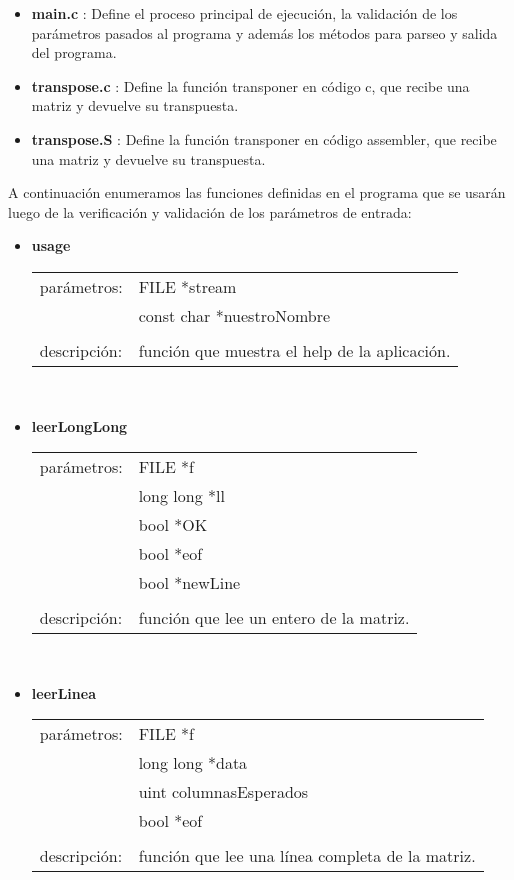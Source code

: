 \documentclass[a4paper]{article}
\begin{document}
\begin{itemize}
	\item \textbf{main.c} : Define el proceso principal de ejecución, la validación de los parámetros pasados al programa y además los métodos para parseo y salida del programa.
    \item \textbf{transpose.c} : Define la función transponer en código c, que recibe una matriz y devuelve su transpuesta.
    \item \textbf{transpose.S} : Define la función transponer en código assembler, que recibe una matriz y devuelve su transpuesta.
\end{itemize}
A continuación enumeramos las funciones definidas en el programa que se usarán luego de la verificación y validación de los parámetros de entrada:
\begin{itemize}
\item \textbf{usage}\\
	\begin{tabular}{ll}
    parámetros: &FILE *stream \\
    			&const char *nuestroNombre\\
    &\\
    descripción: &función que muestra el help de la aplicación.
    \end{tabular}\\

\item \textbf{leerLongLong}\\
	\begin{tabular}{ll}
    parámetros:    &FILE *f\\
                   &long long *ll\\
                   &bool *OK\\
                   &bool *eof\\
                   &bool *newLine\\
	&\\
    descripción: &función que lee un entero de la matriz.
    \end{tabular}\\

\item \textbf{leerLinea}\\
	\begin{tabular}{ll}
    parámetros:    &FILE *f\\
                   &long long *data\\
                   &uint columnasEsperados\\
                   &bool *eof\\
    &\\
    descripción: &función que lee una línea completa de la matriz.
    \end{tabular}\\


\end{itemize}
\end{document}
